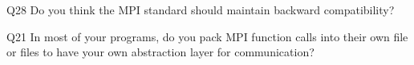 \begin{description}%
\item{Q28} Do you think the MPI standard should maintain backward compatibility?%
\item{Q21} In most of your programs, do you pack MPI function calls into their own file or files to have your own abstraction layer for communication?%
\end{description}%
